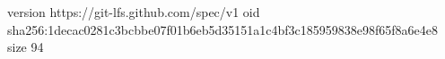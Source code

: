 version https://git-lfs.github.com/spec/v1
oid sha256:1decac0281c3bcbbe07f01b6eb5d35151a1c4bf3c185959838e98f65f8a6e4e8
size 94
